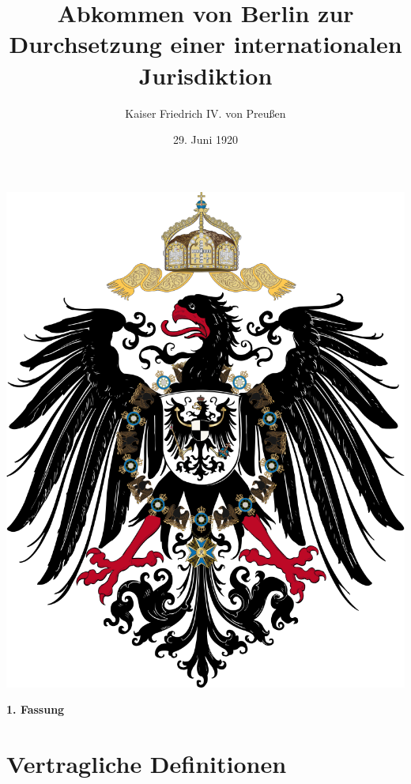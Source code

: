 \documentclass{article}
\title{Abkommen von Berlin zur Durchsetzung einer internationalen Jurisdiktion}
\author{Kaiser Friedrich IV. von Preußen}
\date{29. Juni 1920}
\begin{document}
\maketitle
\begin{center}
    \includegraphics[scale=.15]{dr_wappen}
\end{center}
\newpage
{}
\vspace*{\fill}
\begin{Center}
\textbf{1. Fassung}
\vspace*{\fill}
\end{Center}
\newpage
\tableofcontents
\newpage
\section{Vertragliche Definitionen}
\end{document}
